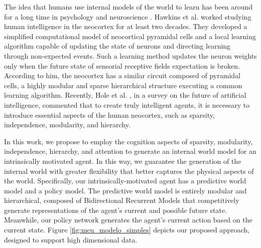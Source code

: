 The idea that humans use internal models of the world to learn has been around for a long time in psychology and neuroscience \cite{hawkins_framework_2019}\cite{hawkins_theory_2017}. Hawkins et al. \cite{hawkins_why_2017} worked studying human intelligence in the neocortex for at least two decades. They developed a simplified computational model of neocortical pyramidal cells and a local learning algorithm capable of updating the state of neurons and directing learning through non-expected events. Such a learning method updates the neuron weights only when the future state of sensorial receptive fields expectation is broken. According to him, the neocortex has a similar circuit composed of pyramidal cells, a highly modular and sparse hierarchical structure executing a common learning algorithm. Recently, Hole et al. \cite{hole_thousand_2021}, in a survey on the future of artificial intelligence, commented that to create truly intelligent agents, it is necessary to introduce essential aspects of the human neocortex, such as sparsity, independence, modularity, and hierarchy.


In this work, we propose to employ the cognition aspects of sparsity, modularity, independence, hierarchy, and attention to generate an internal world model for an intrinsically motivated agent. In this way, we guarantee the generation of the internal world with greater flexibility that better captures the physical aspects of the world. Specifically, our intrinsically-motivated agent has a predictive world model and a policy model. The predictive world model is entirely modular and hierarchical, composed of Bidirectional Recurrent Models \cite{mittal2020learning} that competitively generate representations of the agent's current and possible future state. Meanwhile, our policy network generates the agent's current action based on the current state. Figure \ref{fig:meu_modelo_simples} depicts our proposed approach, designed to support high dimensional data.

